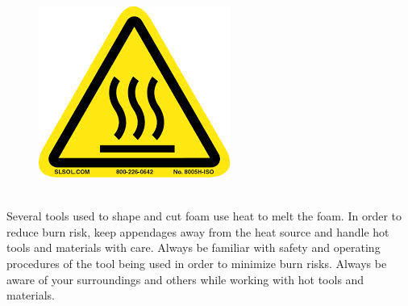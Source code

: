 \begin{framed}
\begin{figure}
\includegraphics[width=\linewidth]{images/burn_hazard.jpg}
\end{figure}
\ \\
Several tools used to shape and cut foam use heat to melt the foam. In order to reduce burn risk, keep appendages away from the heat source and handle hot tools and materials with care. Always be familiar with safety and operating procedures of the tool being used in order to minimize burn risks. Always be aware of your surroundings and others while working with hot tools and materials.
\end{framed}
\ \\
